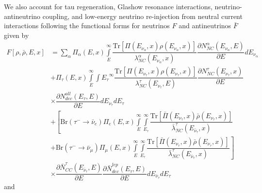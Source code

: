 \documentclass[main.tex]{subfiles}
\begin{document}
We also account for tau regeneration, Glashow resonance interactions, neutrino-antineutrino coupling, and low-energy neutrino re-injection from neutral current interactions following the functional forms for neutrinos $F$ and antineutrinos $\bar{F}$ given by 
\begin{equation}\begin{split}
    F\left[\rho,\bar{\rho}, E, x\right] &= \sum\limits_{\alpha} \Pi_{\alpha}(E,x)\int\limits_{E}^{\infty}\dfrac{\text{Tr}\left[ \Pi(E_{\nu_{\alpha}},x)\rho(E_{\nu_{\alpha}}, x) \right]}{\lambda_{NC}^{\alpha}(E_{\nu_{\alpha}}, x) } \dfrac{\partial N_{NC}^{\alpha}(E_{\nu_{\alpha}}, E)}{\partial E} dE_{\nu_{\alpha}} \\ 
    &+\Pi_{\tau}(E,x) \int\limits_{E}^{\infty}\int\limits{E_{\tau}}^{\infty} \dfrac{\text{Tr}\left[ \Pi(E_{\nu_{\tau}},x)\rho(E_{\nu_{\tau}}, x) \right]}{\lambda_{NC}^{\tau}(E_{\nu_{\tau}}, E) } \dfrac{\partial N_{NC}^{\tau}(E_{\nu_{\tau}}, x)}{\partial E} \\
    &\times \dfrac{\partial N_{dec}^{all}(E_{\tau}, E)}{\partial E} dE_{\nu_{\tau}}dE_{\tau} \\
    &+\left[ \text{Br}\left(\tau^{-} \to \bar{\nu}_{e}\right)\Pi_{e}(E,x)\int\limits_{E}^{\infty}\int\limits_{E_{\tau}}^{\infty} \dfrac{\text{Tr}\left[ \bar{\Pi}(E_{\nu_{\tau}},x)\bar{\rho}(E_{\nu_{\tau}}, x) \right]}{\bar{\lambda}_{NC}^{\tau}(E_{\bar{\nu}_{\tau}}, x) }\right.  \\
    &+ \left. \text{Br}\left(\tau^{-} \to \bar{\nu}_{\mu}\right)\Pi_{\mu}(E,x)\int\limits_{E}^{\infty}\int\limits_{E_{\tau}}^{\infty} \dfrac{\text{Tr}\left[ \bar{\Pi}(E_{\nu_{\tau}},x)\bar{\rho}(E_{\nu_{\tau}}, x) \right]}{\bar{\lambda}_{NC}^{\tau}(E_{\bar{\nu}_{\tau}}, x) } \right] \\
    &\times \dfrac{\partial \bar{N}_{CC}^{\tau}(E_{\bar{\nu}_{\tau}}, E)}{\partial E} \dfrac{\partial\bar{N}_{dec}^{lep} (E_{\tau}, E)}{\partial E} dE_{\bar{\nu}_{\tau}} dE_{\tau}     
\end{split}\end{equation}
and 
\end{document}
